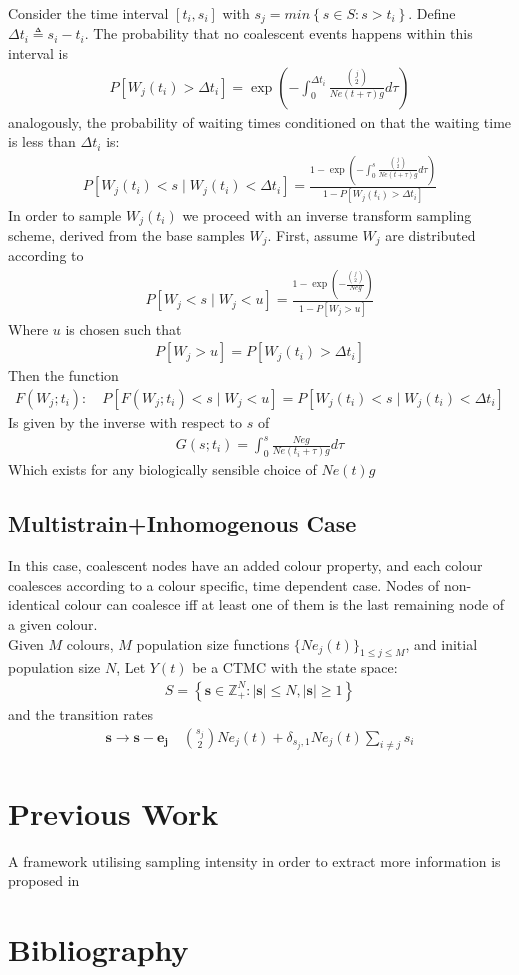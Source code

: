 \documentclass{article}
\newcommand{\Z}{\mathbb{Z}}
\theoremstyle{definition}
\begin{document}
Consider the time interval $[t_i, s_i]$ with $s_j = min\left\{s\in S : s>t_i\right\}$. Define $\Delta t_i \triangleq s_i-t_i$.
The probability that no coalescent events happens within this interval is 
\begin{gather*}
  P[W_j(t_i) > \Delta t_i] = \exp(-\int_0^{\Delta t_i}\frac{\binom{j}{2}}{Ne(t+\tau)g}d\tau)
\end{gather*}
analogously, the probability of waiting times conditioned on that the waiting time is less than $\Delta t_i$ is:
\begin{gather}
  P[W_j(t_i) < s \mid W_j(t_i) < \Delta t_i] =\frac{1-\exp(-\int_0^{s}\frac{\binom{j}{2}}{Ne(t+\tau)g}d\tau)}{1-P[W_j(t_i) > \Delta t_i]}
\end{gather}
In order to sample $W_j(t_i)$ we proceed with an inverse transform sampling scheme, derived from the base samples $W_j$. 
First, assume $W_j$ are distributed according to 
\begin{gather}
  P[W_j < s \mid W_j < u] = \frac{1-\exp(-\frac{\binom{j}{2}}{Neg})}{1-P[W_j>u]}
\end{gather}
Where $u$ is chosen such that
\begin{gather}
P[W_j>u] = P[W_j(t_i) > \Delta t_i]
\end{gather}
Then the function
\begin{gather}
F(W_j; t_i):\quad P[F(W_j;t_i) < s \mid W_j < u] = P[W_j(t_i) < s \mid W_j(t_i) < \Delta t_i] 
\end{gather}
Is given by the inverse with respect to $s$ of
\begin{gather}
G(s; t_i) = \int_0^s \frac{Neg}{Ne(t_i+\tau)g}d\tau
\end{gather}
Which exists for any biologically sensible choice of $Ne(t)g$

\subsection{Multistrain+Inhomogenous Case}
In this case, coalescent nodes have an added colour property, and each colour coalesces according to a colour specific, time dependent case. Nodes of non-identical colour can coalesce iff at least one of them is the last remaining node of a given colour.\\
Given $M$ colours, $M$ population size functions $\{Ne_j(t)\}_{1\leq j\leq M}$, and initial population size $N$, Let $Y(t)$ be a CTMC with the state space:
\begin{gather}
  S = \left\{\mathbf{s}\in \Z_+^{N}:|\mathbf{s}|\leq N, |\mathbf{s}|\geq1\right\}
\end{gather}
and the transition rates
\begin{gather}
\mathbf{s}\to\mathbf{s}-\mathbf{e_j} \quad \binom{s_j}{2}Ne_j(t)+\delta_{s_j, 1}Ne_j(t)\sum_{i\neq j}s_i
\end{gather}

\section{Previous Work}
A framework utilising sampling intensity in order to extract more information is proposed in \cite{parag_jointly_nodate}
\section{Bibliography}
\printbibliography
\end{document}
